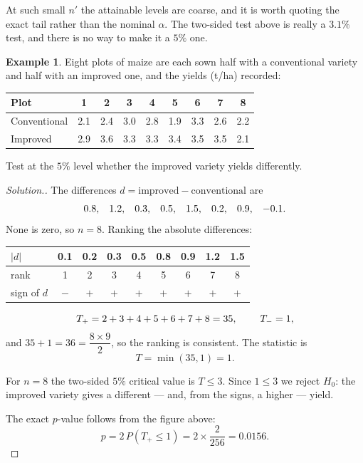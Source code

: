 \documentclass[11pt,a4paper]{article}
\theoremstyle{definition}
\newtheorem{example}[thm]{Example}
\newenvironment{solution}
  {\renewcommand{\qedsymbol}{}\begin{proof}[\textit{Solution}.]}
  {\end{proof}}
\begin{document}
At such small $n'$ the attainable levels are coarse, and it is worth quoting the
exact tail rather than the nominal $\alpha$. The two-sided test above is really a
$3.1\%$ test, and there is no way to make it a $5\%$ one.

\begin{example}
Eight plots of maize are each sown half with a conventional variety and half with
an improved one, and the yields (t/ha) recorded:

\begin{table}[H]
\centering
\begin{tabular}{l|cccccccc}
Plot &1&2&3&4&5&6&7&8\\
\hline
Conventional &2.1&2.4&3.0&2.8&1.9&3.3&2.6&2.2\\
Improved &2.9&3.6&3.3&3.3&3.4&3.5&3.5&2.1\\
\end{tabular}
\end{table}

Test at the $5\%$ level whether the improved variety yields differently.
\end{example}

\begin{solution}
The differences $d=\text{improved}-\text{conventional}$ are
$$0.8,\hspace{0.3cm}1.2,\hspace{0.3cm}0.3,\hspace{0.3cm}0.5,\hspace{0.3cm}
1.5,\hspace{0.3cm}0.2,\hspace{0.3cm}0.9,\hspace{0.3cm}-0.1 .$$
None is zero, so $n=8$. Ranking the absolute differences:

\begin{table}[H]
\centering
\begin{tabular}{l|cccccccc}
$\left|d\right|$ &0.1&0.2&0.3&0.5&0.8&0.9&1.2&1.5\\
\hline
rank &1&2&3&4&5&6&7&8\\
sign of $d$ &$-$&$+$&$+$&$+$&$+$&$+$&$+$&$+$\\
\end{tabular}
\end{table}

$$T_{+}=2+3+4+5+6+7+8=35,\hspace{0.8cm}T_{-}=1,$$
and $35+1=36=\dfrac{8\times 9}{2}$, so the ranking is consistent. The statistic is
$$T=\min(35,1)=1 .$$

For $n=8$ the two-sided $5\%$ critical value is $T\leq 3$. Since $1\leq 3$ we
reject $H_0$: the improved variety gives a different --- and, from the signs, a
higher --- yield.

The exact $p$-value follows from the figure above:
$$p=2\,P\left(T_{+}\leq 1\right)=2\times\dfrac{2}{256}=0.0156 .$$
\end{solution}
\end{document}
